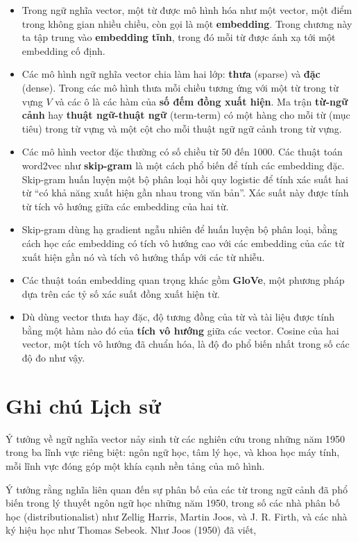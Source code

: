 \begin{itemize}
  \item Trong ngữ nghĩa vector, một từ được mô hình hóa như một vector, một điểm trong không gian nhiều chiều, còn gọi là một \textbf{embedding}. Trong chương này ta tập trung vào \textbf{embedding tĩnh}, trong đó mỗi từ được ánh xạ tới một embedding cố định.
  \item Các mô hình ngữ nghĩa vector chia làm hai lớp: \textbf{thưa} (sparse) và \textbf{đặc} (dense). Trong các mô hình thưa mỗi chiều tương ứng với một từ trong từ vựng $V$ và các ô là các hàm của \textbf{số đếm đồng xuất hiện}. Ma trận \textbf{từ-ngữ cảnh} hay \textbf{thuật ngữ-thuật ngữ} (term-term) có một hàng cho mỗi từ (mục tiêu) trong từ vựng và một cột cho mỗi thuật ngữ ngữ cảnh trong từ vựng.
  \item Các mô hình vector đặc thường có số chiều từ 50 đến 1000. Các thuật toán word2vec như \textbf{skip-gram} là một cách phổ biến để tính các embedding đặc. Skip-gram huấn luyện một bộ phân loại hồi quy logistic để tính xác suất hai từ ``có khả năng xuất hiện gần nhau trong văn bản''. Xác suất này được tính từ tích vô hướng giữa các embedding của hai từ.
  \item Skip-gram dùng hạ gradient ngẫu nhiên để huấn luyện bộ phân loại, bằng cách học các embedding có tích vô hướng cao với các embedding của các từ xuất hiện gần nó và tích vô hướng thấp với các từ nhiễu.
  \item Các thuật toán embedding quan trọng khác gồm \textbf{GloVe}, một phương pháp dựa trên các tỷ số xác suất đồng xuất hiện từ.
  \item Dù dùng vector thưa hay đặc, độ tương đồng của từ và tài liệu được tính bằng một hàm nào đó của \textbf{tích vô hướng} giữa các vector. Cosine của hai vector, một tích vô hướng đã chuẩn hóa, là độ đo phổ biến nhất trong số các độ đo như vậy.
\end{itemize}

\section*{Ghi chú Lịch sử}

Ý tưởng về ngữ nghĩa vector nảy sinh từ các nghiên cứu trong những năm 1950 trong ba lĩnh vực riêng biệt: ngôn ngữ học, tâm lý học, và khoa học máy tính, mỗi lĩnh vực đóng góp một khía cạnh nền tảng của mô hình.

Ý tưởng rằng nghĩa liên quan đến sự phân bố của các từ trong ngữ cảnh đã phổ biến trong lý thuyết ngôn ngữ học những năm 1950, trong số các nhà phân bố học (distributionalist) như Zellig Harris, Martin Joos, và J. R. Firth, và các nhà ký hiệu học như Thomas Sebeok. Như Joos (1950) đã viết,

